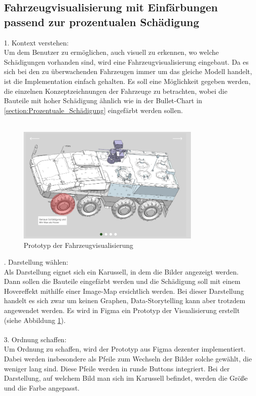 \subsection{Fahrzeugvisualisierung mit Einfärbungen passend zur prozentualen Schädigung}
\label{sec:vehicle-images}
1. Kontext verstehen:\\
Um dem Benutzer zu ermöglichen, auch visuell zu erkennen, wo welche Schädigungen vorhanden sind, wird eine Fahrzeugvisualisierung eingebaut. Da es sich bei den zu überwachenden Fahrzeugen immer um das gleiche Modell handelt, ist die Implementation einfach gehalten. Es soll eine Möglichkeit gegeben werden, die einzelnen Konzeptzeichnungen der Fahrzeuge zu betrachten, wobei die Bauteile mit hoher Schädigung ähnlich wie in der Bullet-Chart in \ref{section:Prozentuale_Schädigung} eingefärbt werden sollen.\\\\
\begin{figure}[h!]
\centering
\includegraphics[width=0.8\textwidth]{gfx/vehicle_visualisation.png}
\caption{Prototyp der Fahrzeugvisualisierung}
\label{fig:vehicle_visualisation}
\end{figure}
. Darstellung wählen:\\
Als Darstellung eignet sich ein Karussell, in dem die Bilder angezeigt werden. Dann sollen die Bauteile eingefärbt werden und die Schädigung soll mit einem Hovereffekt mithilfe einer Image-Map ersichtlich werden. Bei dieser Darstellung handelt es sich zwar um keinen Graphen, Data-Storytelling kann aber trotzdem angewendet werden. Es wird in Figma \cite{FigmaGmbH.2024} ein Prototyp der Visualisierung erstellt (siehe Abbildung \ref{fig:vehicle_visualisation}).\\\\
3. Ordnung schaffen:\\
Um Ordnung zu schaffen, wird der Prototyp aus Figma \cite{FigmaGmbH.2024} dezenter implementiert. Dabei werden insbesondere als Pfeile zum Wechseln der Bilder solche gewählt, die weniger lang sind. Diese Pfeile werden in runde Buttons integriert. Bei der Darstellung, auf welchem Bild man sich im Karussell befindet, werden die Größe und die Farbe angepasst.\\\\
